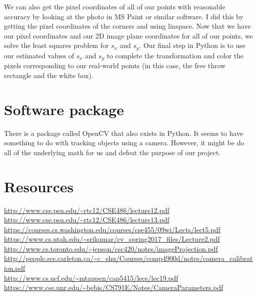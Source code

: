 \documentclass{article}
\begin{document}
We can also get the pixel coordinates of all of our points with reasonable accuracy by looking at the photo in MS Paint or similar software. I did this by getting the pixel coordinates of the corners and using linspace. Now that we have our pixel coordinates and our 2D image plane coordinates for all of our points, we solve the least squares problem for $s_x$ and $s_y$. Our final step in Python is to use our estimated values of $s_x$ and $s_y$ to complete the transformation and color the pixels corresponding to our real-world points (in this case, the free throw rectangle and the white box).

\section{Software package}
There is a package called OpenCV that also exists in Python. It seems to have something to do with tracking objects using a camera. However, it might be do all of the underlying math for us and defeat the purpose of our project.

\bigskip
\section{Resources}
\url{http://www.cse.psu.edu/~rtc12/CSE486/lecture12.pdf} \\
\url{http://www.cse.psu.edu/~rtc12/CSE486/lecture13.pdf} \\
\url{https://courses.cs.washington.edu/courses/cse455/09wi/Lects/lect5.pdf} \\
\url{https://www.cs.utah.edu/~srikumar/cv_spring2017_files/Lecture2.pdf} \\
\url{http://www.cs.toronto.edu/~jepson/csc420/notes/imageProjection.pdf} \\
\url{http://people.scs.carleton.ca/~c_shu/Courses/comp4900d/notes/camera_calibration.pdf} \\
\url{http://www.cs.ucf.edu/~mtappen/cap5415/lecs/lec19.pdf} \\
\url{https://www.cse.unr.edu/~bebis/CS791E/Notes/CameraParameters.pdf} \\
\end{document}
